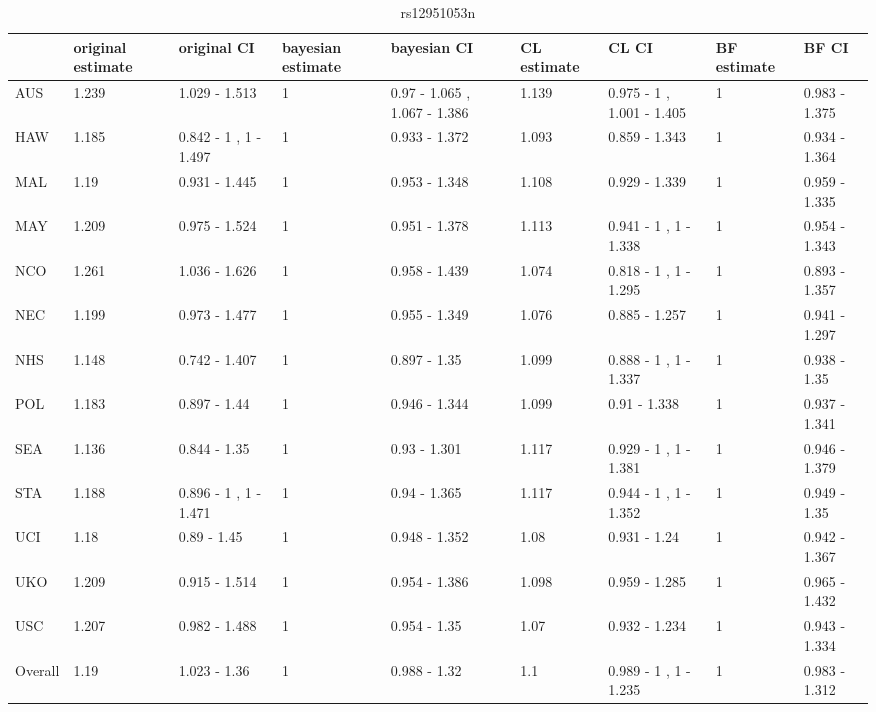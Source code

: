 \documentclass[AMA,STIX1COL]{WileyNJD-v2}\usepackage[]{graphicx}\usepackage[]{color}
\begin{document}
\begin{table}

\caption{\label{tab:unnamed-chunk-39}rs12951053n}
\centering
\begin{tabular}[t]{l|l|l|l|l|l|l|l|l}
\hline
  & original estimate & original CI & bayesian estimate & bayesian CI & CL estimate & CL CI & BF estimate & BF CI\\
\hline
AUS & 1.239 & 1.029 - 1.513 & 1 & 0.97 - 1.065 ,  1.067 - 1.386 & 1.139 & 0.975 - 1 ,  1.001 - 1.405 & 1 & 0.983 - 1.375\\
\hline
HAW & 1.185 & 0.842 - 1 ,  1 - 1.497 & 1 & 0.933 - 1.372 & 1.093 & 0.859 - 1.343 & 1 & 0.934 - 1.364\\
\hline
MAL & 1.19 & 0.931 - 1.445 & 1 & 0.953 - 1.348 & 1.108 & 0.929 - 1.339 & 1 & 0.959 - 1.335\\
\hline
MAY & 1.209 & 0.975 - 1.524 & 1 & 0.951 - 1.378 & 1.113 & 0.941 - 1 ,  1 - 1.338 & 1 & 0.954 - 1.343\\
\hline
NCO & 1.261 & 1.036 - 1.626 & 1 & 0.958 - 1.439 & 1.074 & 0.818 - 1 ,  1 - 1.295 & 1 & 0.893 - 1.357\\
\hline
NEC & 1.199 & 0.973 - 1.477 & 1 & 0.955 - 1.349 & 1.076 & 0.885 - 1.257 & 1 & 0.941 - 1.297\\
\hline
NHS & 1.148 & 0.742 - 1.407 & 1 & 0.897 - 1.35 & 1.099 & 0.888 - 1 ,  1 - 1.337 & 1 & 0.938 - 1.35\\
\hline
POL & 1.183 & 0.897 - 1.44 & 1 & 0.946 - 1.344 & 1.099 & 0.91 - 1.338 & 1 & 0.937 - 1.341\\
\hline
SEA & 1.136 & 0.844 - 1.35 & 1 & 0.93 - 1.301 & 1.117 & 0.929 - 1 ,  1 - 1.381 & 1 & 0.946 - 1.379\\
\hline
STA & 1.188 & 0.896 - 1 ,  1 - 1.471 & 1 & 0.94 - 1.365 & 1.117 & 0.944 - 1 ,  1 - 1.352 & 1 & 0.949 - 1.35\\
\hline
UCI & 1.18 & 0.89 - 1.45 & 1 & 0.948 - 1.352 & 1.08 & 0.931 - 1.24 & 1 & 0.942 - 1.367\\
\hline
UKO & 1.209 & 0.915 - 1.514 & 1 & 0.954 - 1.386 & 1.098 & 0.959 - 1.285 & 1 & 0.965 - 1.432\\
\hline
USC & 1.207 & 0.982 - 1.488 & 1 & 0.954 - 1.35 & 1.07 & 0.932 - 1.234 & 1 & 0.943 - 1.334\\
\hline
Overall & 1.19 & 1.023 - 1.36 & 1 & 0.988 - 1.32 & 1.1 & 0.989 - 1 ,  1 - 1.235 & 1 & 0.983 - 1.312\\
\hline
\end{tabular}
\end{table}
\end{document}
